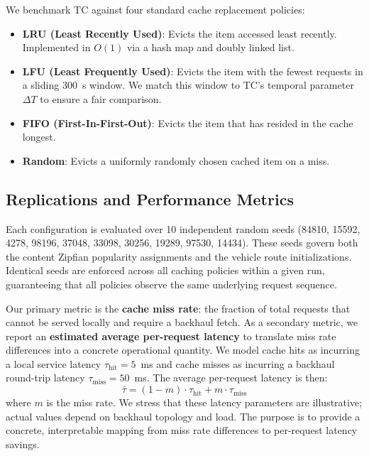 \documentclass[preprint,12pt]{elsarticle}
\begin{document}
	We benchmark TC against four standard cache replacement policies:
	\begin{itemize}
		\item \textbf{LRU (Least Recently Used)}: Evicts the item accessed least recently. Implemented in $O(1)$ via a hash map and doubly linked list.
		\item \textbf{LFU (Least Frequently Used)}: Evicts the item with the fewest requests in a sliding 300~s window. We match this window to TC's temporal parameter $\Delta T$ to ensure a fair comparison.
		\item \textbf{FIFO (First-In-First-Out)}: Evicts the item that has resided in the cache longest.
		\item \textbf{Random}: Evicts a uniformly randomly chosen cached item on a miss.
	\end{itemize}
	
	\subsection{Replications and Performance Metrics}
	
	Each configuration is evaluated over 10 independent random seeds (84810, 15592, 4278, 98196, 37048, 33098, 30256, 19289, 97530, 14434). These seeds govern both the content Zipfian popularity assignments and the vehicle route initializations. Identical seeds are enforced across all caching policies within a given run, guaranteeing that all policies observe the same underlying request sequence.
	
	Our primary metric is the \textbf{cache miss rate}: the fraction of total requests that cannot be served locally and require a backhaul fetch. As a secondary metric, we report an \textbf{estimated average per-request latency} to translate miss rate differences into a concrete operational quantity. We model cache hits as incurring a local service latency $\tau_\text{hit} = 5$~ms and cache misses as incurring a backhaul round-trip latency $\tau_\text{miss} = 50$~ms. The average per-request latency is then:
	\begin{equation}
		\bar{\tau} = (1 - m) \cdot \tau_\text{hit} + m \cdot \tau_\text{miss}
		\label{eq:latency}
	\end{equation}
	where $m$ is the miss rate. We stress that these latency parameters are illustrative; actual values depend on backhaul topology and load. The purpose is to provide a concrete, interpretable mapping from miss rate differences to per-request latency savings.
	
\end{document}
